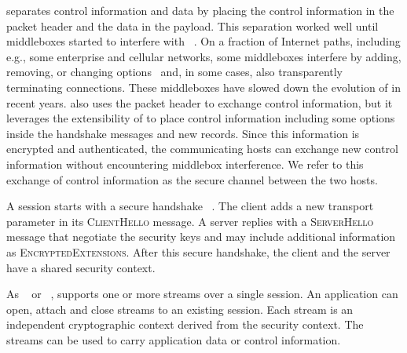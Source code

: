 
\tcp separates control information and data by placing the control information
in the packet header and the data in the payload. This separation worked well
until middleboxes started to interfere with \tcp~\cite{10.1145/1064413.1064418,
  honda2011still, DHBVD13}.  On a fraction of Internet paths, including e.g.,
some enterprise and cellular networks, some middleboxes interfere by adding,
removing, or changing \tcp options~\cite{wang2011untold, honda2011still,xu2015investigating} and, in some cases, also transparently terminating \tcp
connections. These middleboxes have slowed down the evolution of \tcp in recent
years. \tcpls also uses the packet header to exchange \tcp control information,
but it leverages the extensibility of  to place control
information including some \tcp options inside the \tls handshake messages
and new \tls records. Since this information is encrypted and authenticated, the
communicating hosts can exchange new control information without encountering
middlebox interference. We refer to this exchange of control information as the
secure channel between the two hosts.

A \tcpls session starts with a secure  handshake ~\cite{rfc8446}. The
client adds a new \tcpls transport parameter in its \textsc{ClientHello} message. A \tcpls server replies with a \textsc{ServerHello} message that negotiate
the security keys and may include additional \tcpls information as
\textsc{EncryptedExtensions}. After this secure handshake, the client and the
server have a shared security context.

As \sctp~\cite{rfc4960} or \quic~\cite{draft-ietf-quic-transport}, \tcpls
supports one or more streams over a single \tcpls session. An application
can open, attach and close streams to an existing \tcpls session. Each
stream is an independent cryptographic context derived from the \tcpls
security context. The \tcpls streams can be used to carry application data
or control information.


